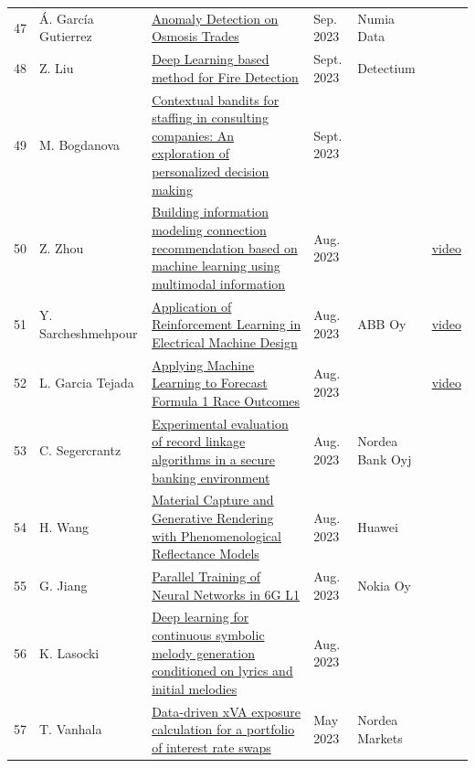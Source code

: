 \documentclass[11pt,a4paper]{article}
\begin{document}
\begin{longtable}{@{}r p{2.8cm} p{6.3cm} p{1.6cm} p{2cm} p{1.8cm}@{}}
47 & Á. García Gutierrez & \href{https://aaltodoc.aalto.fi/items/0c0526a5-b55e-432f-9d03-f265f0df63d1}{Anomaly Detection on Osmosis Trades} & Sep. 2023 & Numia Data &  \\
48 & Z. Liu & \href{https://aaltodoc.aalto.fi/items/e721634e-004a-4a29-b018-1d41a17d33e8}{Deep Learning based method for Fire Detection} & Sept. 2023 & Detectium &  \\
49 & M. Bogdanova & \href{https://aaltodoc.aalto.fi/items/041f9210-3920-43fa-b4b7-dda5de9079f7}{Contextual bandits for staffing in consulting companies: An exploration of personalized decision making} & Sept. 2023 &  &  \\
50 & Z. Zhou & \href{https://aaltodoc.aalto.fi/items/38769eb0-f6f4-4392-9ca0-a4cfab7e031f}{Building information modeling connection recommendation based on machine learning using multimodal information} & Aug. 2023 &  & \href{https://youtu.be/8lOAhhuWqr0}{video} \\
51 & Y. Sarcheshmehpour & \href{https://aaltodoc.aalto.fi/handle/123456789/122863}{Application of Reinforcement Learning in Electrical Machine Design} & Aug. 2023 & ABB Oy & \href{https://youtu.be/a6RJawYzyJM}{video} \\
52 & L. Garcia Tejada & \href{https://aaltodoc.aalto.fi/handle/123456789/122937}{Applying Machine Learning to Forecast Formula 1 Race Outcomes} & Aug. 2023 &  & \href{https://youtu.be/q01GzbSDsSg}{video} \\
53 & C. Segercrantz & \href{https://aaltodoc.aalto.fi/handle/123456789/123205}{Experimental evaluation of record linkage algorithms in a secure banking environment} & Aug. 2023 & Nordea Bank Oyj &  \\
54 & H. Wang & \href{https://aaltodoc.aalto.fi/handle/123456789/122900}{Material Capture and Generative Rendering with Phenomenological Reflectance Models} & Aug. 2023 & Huawei &  \\
55 & G. Jiang & \href{https://aaltodoc.aalto.fi/handle/123456789/122835}{Parallel Training of Neural Networks in 6G L1} & Aug. 2023 & Nokia Oy &  \\
56 & K. Lasocki & \href{https://www.finna.fi/Record/aaltodoc.123456789_122794}{Deep learning for continuous symbolic melody generation conditioned on lyrics and initial melodies} & Aug. 2023 &  &  \\
57 & T. Vanhala & \href{https://aaltodoc.aalto.fi/handle/123456789/120932}{Data-driven xVA exposure calculation for a portfolio of interest rate swaps} & May 2023 & Nordea Markets &  \\

\end{longtable}
\end{document}
